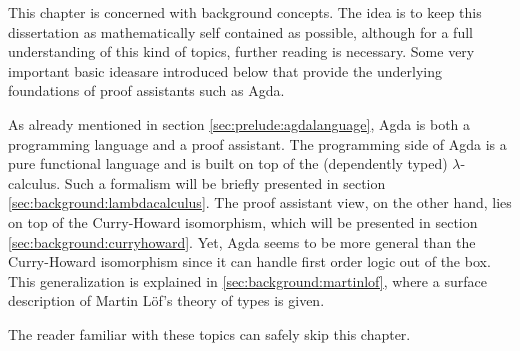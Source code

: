 This chapter is concerned with background concepts. The idea is to keep this dissertation as
mathematically self contained as possible, although for a full understanding of this kind of topics, further
reading is necessary. Some very important basic ideasare introduced below that provide the underlying foundations of proof assistants such as Agda.

As already mentioned in section \ref{sec:prelude:agdalanguage}, Agda is both a programming language and a proof assistant. The programming side of Agda is a pure functional language and is built on top of the (dependently typed) $\lambda$-calculus. Such a formalism will be briefly presented in section \ref{sec:background:lambdacalculus}. The proof assistant view, on the other hand, lies on top of the Curry-Howard isomorphism, which will be presented in section \ref{sec:background:curryhoward}. Yet, Agda seems to be
more general than the Curry-Howard isomorphism since it can handle first order logic out of the box. 
This generalization is explained in \ref{sec:background:martinlof}, where a surface description
of Martin L\"{o}f's theory of types is given.

The reader familiar with these topics can safely skip this chapter. 
